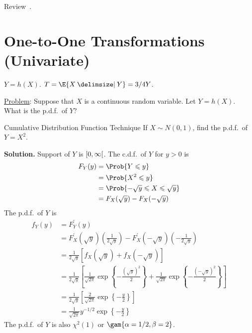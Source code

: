 \begin{Exercise}{}{}
    Review~.
\end{Exercise}
\section{One-to-One Transformations (Univariate)}
$ Y=h(X) $. $ T=\E{X\given Y}=3/4Y $.

\underline{Problem}: Suppose that $ X $ is a continuous
random variable. Let $ Y=h(X) $. What is the p.d.f.\ of $ Y $?
\begin{Example}{Cumulative Distribution Function Technique}{}
    If $ X \sim N(0,1) $, find the p.d.f.\ of $ Y=X^2 $.

    \textbf{Solution.} Support of $ Y $ is $ \interval[open right]{0}{\infty} $.
    The c.d.f.\ of $ Y $ for $ y>0 $ is
    \begin{align*}
        F_Y(y)
         & =\Prob{Y\leqslant y}                           \\
         & =\Prob{X^2\leqslant y}                         \\
         & =\Prob{-\sqrt{y}\leqslant X\leqslant \sqrt{y}} \\
         & =F_X(\sqrt{y})-F_X(-\sqrt{y})
    \end{align*}
    The p.d.f.\ of $ Y $ is
    \begin{align*}
        f_Y(y)
         & =F_Y^\prime(y)                                                   \\
         & =F_X^\prime(\sqrt{y})\left( \frac{1}{2\sqrt{y}} \right)-
        F_X^\prime(-\sqrt{y})\left(-\frac{1}{2\sqrt{y}}\right)              \\
         & =\frac{1}{2\sqrt{y}}
        \left[ f_X(\sqrt{y})+f_X(-\sqrt{y})  \right]                        \\
         & =\frac{1}{2\sqrt{y}}
        \left[
            \frac{1}{\sqrt{2\pi}}\exp\left\{ -\frac{(\sqrt{y})^2}{2}\right\}
            +
            \frac{1}{\sqrt{2\pi}}\exp\left\{ -\frac{(-\sqrt{y})^2}{2}\right\}
        \right]                                                             \\
         & =\frac{1}{2\sqrt{y}}
        \left[ \frac{2}{\sqrt{2\pi}}\exp\left\{-\frac{y}{2}\right\} \right] \\
         & =\frac{1}{\sqrt{2\pi}}y^{-1/2}\exp\left\{ -\frac{y}{2} \right\}
    \end{align*}
    The p.d.f.\ of $ Y $ is also $ \chi^2(1) $ or
    $ \gam{\alpha=1/2,\beta=2} $.
\end{Example}
